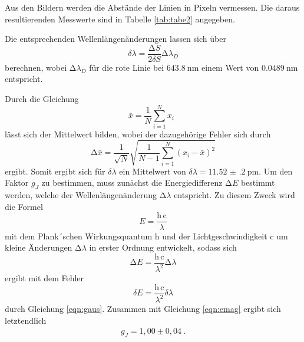 Aus den Bildern werden die Abstände der Linien in Pixeln vermessen. Die daraus resultierenden Messwerte sind
in Tabelle \ref{tab:tabe2} angegeben.

Die entsprechenden Wellenlängenänderungen lassen sich über
\begin{equation}
  \delta \lambda = \frac{\increment S}{2 \delta S} \increment \lambda_D
\end{equation}
berechnen, wobei $\increment \lambda_D$ für die rote Linie bei $\SI{643.8}{\nano\meter}$
einem Wert von $\SI{0.0489}{\nano\meter}$ entspricht.

Durch die Gleichung
\begin{equation}
  \bar{x} = \frac{1}{N} \sum_{i=1}^{N} x_i \: \:
  \label{eqn:mit}
\end{equation}
\noindent lässt sich der Mittelwert bilden, wobei der dazugehörige Fehler sich durch
\begin{equation}
  \increment \bar{x} = \frac{1}{\sqrt{N}} \sqrt{ \frac{1}{N-1} \sum_{i=1}^N
  (x_i - \bar{x})^2}
  \label{eqn:mitf}
\end{equation}
ergibt. Somit ergibt sich für $\delta \lambda$ ein Mittelwert von
$ \delta \lambda = \SI{11.52(20)}{\pico\meter} $.
Um den Faktor $g_J$ zu bestimmen, muss zunächst die Energiedifferenz $\increment E$ bestimmt werden, welche
der Wellenlängenänderung $\increment \lambda$ entspricht. Zu diesem Zweck wird die Formel
\begin{equation}
  E=\frac{\text{h}\, \text{c} }{\lambda}
\end{equation}
mit dem Plank´schen Wirkungsquantum h und der Lichtgeschwindigkeit c um kleine Änderungen $\increment \lambda$
in erster Ordnung entwickelt, sodass sich
\begin{equation}
  \increment E =\frac{\text{h}\, \text{c} }{\lambda^2}\increment \lambda
  \label{eqn:de}
\end{equation}
ergibt
mit dem Fehler
\begin{equation}
  \delta E =\frac{\text{h}\, \text{c} }{\lambda^2}\delta \lambda
  \label{eqn:fde}
\end{equation}
durch Gleichung \ref{eqn:gaus}.
Zusammen mit Gleichung \ref{eqn:emag} ergibt sich letztendlich
\begin{align*}
g_J=1,00 \pm 0,04 \: .
\end{align*}

